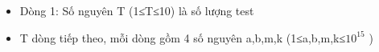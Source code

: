 \begin{itemize}
	\item     Dòng 1: Số nguyên T (1≤T≤10) là số lượng test   
	\item     T dòng tiếp theo, mỗi dòng gồm 4 số nguyên a,b,m,k (1≤a,b,m,k≤$10^{15}$    )   
\end{itemize}